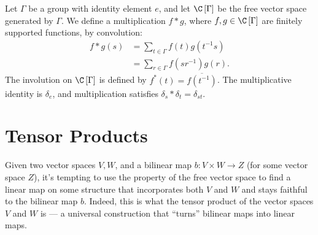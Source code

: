 \begin{definition}
  Let $\Gamma$ be a group with identity element $e$, and let $\C\left[\Gamma\right]$ be the free vector space generated by $\Gamma$. We define a multiplication $f \ast g$, where $f,g\in \C\left[\Gamma\right]$ are finitely supported functions, by convolution:
  \begin{align*}
    f\ast g(s) &= \sum_{t\in\Gamma}f(t)g\left(t^{-1}s\right)\\
               &= \sum_{r\in\Gamma}f\left(sr^{-1}\right)g\left(r\right).
  \end{align*}
  The involution on $\C\left[\Gamma\right]$ is defined by $f^{\ast}\left(t\right) = \overline{f\left(t^{-1}\right)}$. The multiplicative identity is $\delta_e$, and multiplication satisfies $\delta_s\ast \delta_t = \delta_{st}$.
\end{definition}
\section{Tensor Products}%
Given two vector spaces $V,W$, and a bilinear map $b\colon V\times W \rightarrow Z$ (for some vector space $Z$), it's tempting to use the property of the free vector space to find a linear map on some structure that incorporates both $V$ and $W$ and stays faithful to the bilinear map $b$. Indeed, this is what the tensor product of the vector spaces $V$ and $W$ is --- a universal construction that ``turns'' bilinear maps into linear maps.\newline

